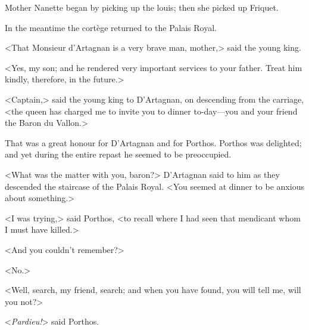 Mother Nanette began by picking up the louis; then she picked up Friquet.

In the meantime the cortège returned to the Palais Royal.

<That Monsieur d'Artagnan is a very brave man, mother,> said the young king.

<Yes, my son; and he rendered very important services to your father. Treat him kindly, therefore, in the future.>

<Captain,> said the young king to D'Artagnan, on descending from the carriage, <the queen has charged me to invite you to dinner to-day—you and your friend the Baron du Vallon.>

That was a great honour for D'Artagnan and for Porthos. Porthos was delighted; and yet during the entire repast he seemed to be preoccupied.

<What was the matter with you, baron?> D'Artagnan said to him as they descended the staircase of the Palais Royal. <You seemed at dinner to be anxious about something.>

<I was trying,> said Porthos, <to recall where I had seen that mendicant whom I must have killed.>

<And you couldn't remember?>

<No.>

<Well, search, my friend, search; and when you have found, you will tell me, will you not?>

<\textit{Pardieu!}> said Porthos. 